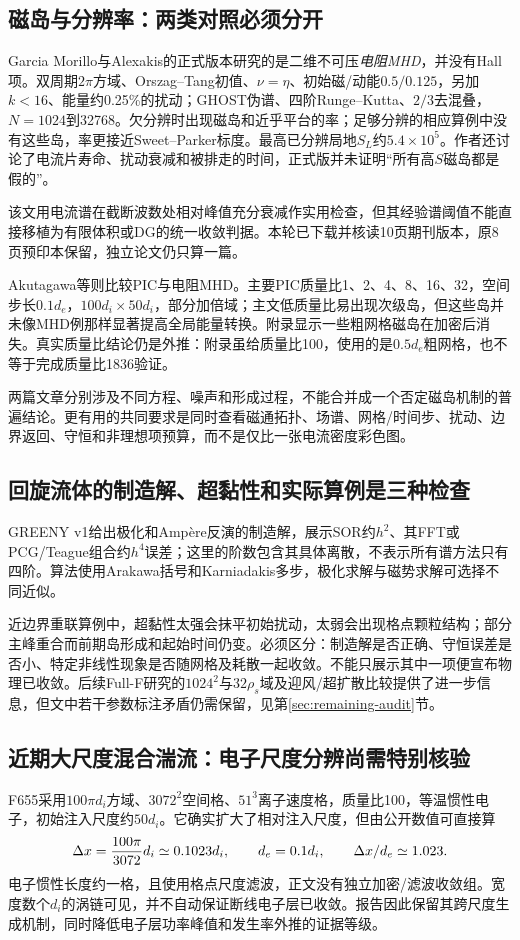 \subsection{磁岛与分辨率：两类对照必须分开}
Garcia Morillo与Alexakis的正式版本\citep{F788}研究的是二维不可压\emph{电阻MHD}，并没有Hall项。双周期$2\pi$方域、Orszag--Tang初值、$\nu=\eta$、初始磁/动能$0.5/0.125$，另加$k<16$、能量约0.25\%的扰动；GHOST伪谱、四阶Runge--Kutta、$2/3$去混叠，$N=1024$到32768。欠分辨时出现磁岛和近乎平台的率；足够分辨的相应算例中没有这些岛，率更接近Sweet--Parker标度。最高已分辨局地$S_L$约$5.4\times10^5$。作者还讨论了电流片寿命、扰动衰减和被排走的时间，正式版并未证明“所有高$S$磁岛都是假的”。

该文用电流谱在截断波数处相对峰值充分衰减作实用检查，但其经验谱阈值不能直接移植为有限体积或DG的统一收敛判据。本轮已下载并核读10页期刊版本，原8页预印本保留，独立论文仍只算一篇。

Akutagawa等\citep{F606}则比较PIC与电阻MHD。主要PIC质量比1、2、4、8、16、32，空间步长$0.1d_e$，$100d_i\times50d_i$，部分加倍域；主文低质量比易出现次级岛，但这些岛并未像MHD例那样显著提高全局能量转换。附录显示一些粗网格磁岛在加密后消失。真实质量比结论仍是外推：附录虽给质量比100，使用的是$0.5d_e$粗网格，也不等于完成质量比1836验证。

两篇文章分别涉及不同方程、噪声和形成过程，不能合并成一个否定磁岛机制的普遍结论。更有用的共同要求是同时查看磁通拓扑、场谱、网格/时间步、扰动、边界返回、守恒和非理想项预算，而不是仅比一张电流密度彩色图。

\subsection{回旋流体的制造解、超黏性和实际算例是三种检查}
GREENY v1\citep{E473}给出极化和Ampère反演的制造解，展示SOR约$h^2$、其FFT或PCG/Teague组合约$h^4$误差；这里的阶数包含其具体离散，不表示所有谱方法只有四阶。算法使用Arakawa括号和Karniadakis多步，极化求解与磁势求解可选择不同近似。

近边界重联算例中，超黏性太强会抹平初始扰动，太弱会出现格点颗粒结构；部分主峰重合而前期岛形成和起始时间仍变。必须区分：制造解是否正确、守恒误差是否小、特定非线性现象是否随网格及耗散一起收敛。不能只展示其中一项便宣布物理已收敛。后续Full-F研究\citep{L314}的$1024^2$与$32\rho_s$域及迎风/超扩散比较提供了进一步信息，但文中若干参数标注矛盾仍需保留，见第\ref{sec:remaining-audit}节。

\subsection{近期大尺度混合湍流：电子尺度分辨尚需特别核验}
F655\citep{F655}采用$100\pi d_i$方域、$3072^2$空间格、$51^3$离子速度格，质量比100，等温惯性电子，初始注入尺度约$50d_i$。它确实扩大了相对注入尺度，但由公开数值可直接算
\begin{equation*}
 \Delta x={100\pi\over3072}d_i\simeq0.1023d_i,
 \qquad d_e=0.1d_i,\qquad\Delta x/d_e\simeq1.023.
\end{equation*}
电子惯性长度约一格，且使用格点尺度滤波，正文没有独立加密/滤波收敛组。宽度数个$d_i$的涡链可见，并不自动保证断线电子层已收敛。报告因此保留其跨尺度生成机制，同时降低电子层功率峰值和发生率外推的证据等级。

